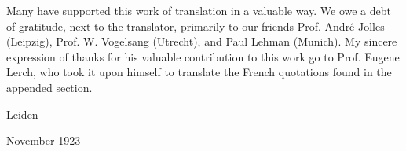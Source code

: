 Many have supported this work of translation in a valuable way. We owe a
debt of gratitude, next to the translator, primarily to our friends
Prof. André Jolles (Leipzig), Prof. W. Vogelsang (Utrecht), and Paul
Lehman (Munich). My sincere expression of thanks for his valuable
contribution to this work go to Prof. Eugene Lerch, who took it upon
himself to translate the French quotations found in the appended
section.

Leiden

November 1923